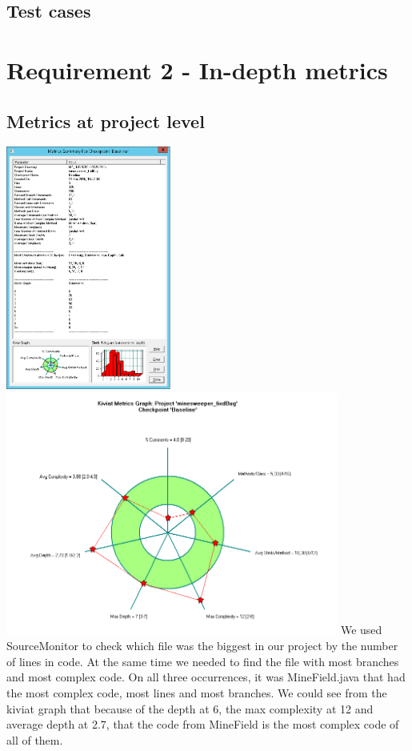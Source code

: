 \documentclass[UKenglish]{article}  %
\begin{document}
\subsection{Test cases}

\section{Requirement 2 - In-depth metrics}

\subsection{Metrics at project level}
\includegraphics[height=8cm]{metric_summary}
\includegraphics[height=8cm]{kiviat_diagram_baseline}
We used SourceMonitor to check which file was the biggest in our project by the number of lines in code. At the same time we needed to find the file with most branches and most complex code. On all three occurrences, it was MineField.java that had the most complex code, most lines and most branches. We could see from the kiviat graph that because of the depth at 6, the max complexity at 12 and average depth at 2.7, that the code from MineField is the most complex code of all of them. 
\end{document}
